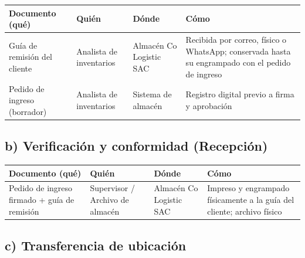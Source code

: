 \documentclass[11pt, a4paper, oneside]{report}
\begin{document}
\begin{table}[H]
\centering\small
\renewcommand{\arraystretch}{1.25}
\setlength{\tabcolsep}{5pt}
\begin{tabularx}{\textwidth}{|>{\raggedright\arraybackslash}X|>{\raggedright\arraybackslash}p{}|>{\raggedright\arraybackslash}p{}|>{\raggedright\arraybackslash}X|}
\hline
\rowcolor{upeu_mid}
\color{white}\bfseries Documento (qué) & \color{white}\bfseries Quién & \color{white}\bfseries Dónde & \color{white}\bfseries Cómo \\ \hline
\rowcolor{gray!10}
Guía de remisión del cliente & Analista de inventarios & Almacén Co Logistic SAC & Recibida por correo, físico o WhatsApp; conservada hasta su engrampado con el pedido de ingreso \\ \hline
Pedido de ingreso (borrador) & Analista de inventarios & Sistema de almacén & Registro digital previo a firma y aprobación \\ \hline
\end{tabularx}
\end{table}

\subsection*{b) Verificación y conformidad (Recepción)}

\begin{table}[H]
\centering\small
\renewcommand{\arraystretch}{1.25}
\setlength{\tabcolsep}{5pt}
\begin{tabularx}{\textwidth}{|>{\raggedright\arraybackslash}X|>{\raggedright\arraybackslash}p{}|>{\raggedright\arraybackslash}p{}|>{\raggedright\arraybackslash}X|}
\hline
\rowcolor{upeu_mid}
\color{white}\bfseries Documento (qué) & \color{white}\bfseries Quién & \color{white}\bfseries Dónde & \color{white}\bfseries Cómo \\ \hline
\rowcolor{gray!10}
Pedido de ingreso firmado + guía de remisión & Supervisor / Archivo de almacén & Almacén Co Logistic SAC & Impreso y engrampado físicamente a la guía del cliente; archivo físico \\ \hline
\end{tabularx}
\end{table}

\subsection*{c) Transferencia de ubicación}
\end{document}
